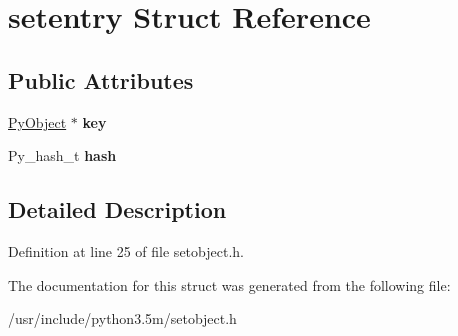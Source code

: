 \hypertarget{structsetentry}{}\section{setentry Struct Reference}
\label{structsetentry}
\subsection*{Public Attributes}
\begin{DoxyCompactItemize}
\item 
\hyperlink{struct__object}{Py\+Object} $\ast$ {\bfseries key}\hypertarget{structsetentry_a1825321554c31751882b7f447dbb2a28}{}\label{structsetentry_a1825321554c31751882b7f447dbb2a28}

\item 
Py\+\_\+hash\+\_\+t {\bfseries hash}\hypertarget{structsetentry_a4c172668dcbb4b0b1c582160a8b50c4f}{}\label{structsetentry_a4c172668dcbb4b0b1c582160a8b50c4f}

\end{DoxyCompactItemize}


\subsection{Detailed Description}


Definition at line 25 of file setobject.\+h.



The documentation for this struct was generated from the following file\+:\begin{DoxyCompactItemize}
\item 
/usr/include/python3.\+5m/setobject.\+h\end{DoxyCompactItemize}
